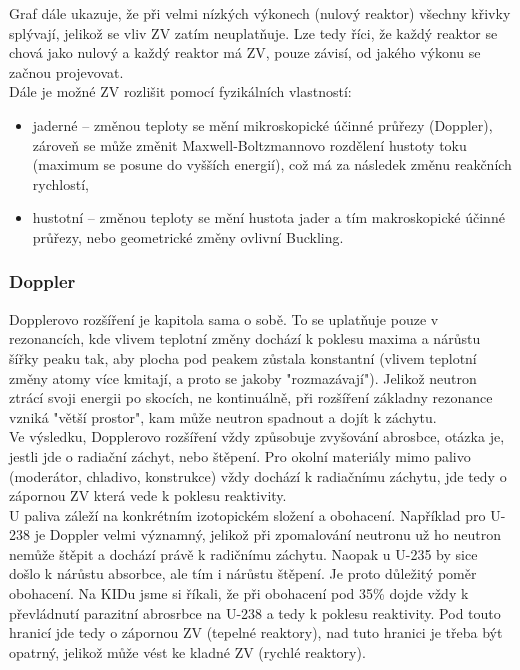 Graf dále ukazuje, že při velmi nízkých výkonech (nulový reaktor) všechny křivky splývají, jelikož se vliv ZV zatím neuplatňuje. Lze tedy říci, že každý reaktor se chová jako nulový a každý reaktor má ZV, pouze závisí, od jakého výkonu se začnou projevovat.\\

Dále je možné ZV rozlišit pomocí fyzikálních vlastností:

\begin{itemize}
  \item jaderné -- změnou teploty se mění mikroskopické účinné průřezy (Doppler), zároveň se může změnit Maxwell-Boltzmannovo rozdělení hustoty toku (maximum se posune do vyšších energií), což má za následek změnu reakčních rychlostí,
  \item hustotní -- změnou teploty se mění hustota jader a tím makroskopické účinné průřezy, nebo geometrické změny ovlivní Buckling.
\end{itemize}

\subsubsection{Doppler}

Dopplerovo rozšíření je kapitola sama o sobě. To se uplatňuje pouze v rezonancích, kde vlivem teplotní změny dochází k poklesu maxima a nárůstu šířky peaku tak, aby plocha pod peakem zůstala konstantní (vlivem teplotní změny atomy více kmitají, a proto se jakoby "rozmazávají"). Jelikož neutron ztrácí svoji energii po skocích, ne kontinuálně, při rozšíření základny rezonance vzniká "větší prostor", kam může neutron spadnout a dojít k záchytu.\\

Ve výsledku, Dopplerovo rozšíření vždy způsobuje zvyšování abrosbce, otázka je, jestli jde o radiační záchyt, nebo štěpení. Pro okolní materiály mimo palivo (moderátor, chladivo, konstrukce) vždy dochází k radiačnímu záchytu, jde tedy o zápornou ZV která vede k poklesu reaktivity.\\

U paliva záleží na konkrétním izotopickém složení a obohacení. Například pro U-238 je Doppler velmi významný, jelikož při zpomalování neutronu už ho neutron nemůže štěpit a dochází právě k radičnímu záchytu. Naopak u U-235 by sice došlo k nárůstu absorbce, ale tím i nárůstu štěpení. Je proto důležitý poměr obohacení. Na KIDu jsme si říkali, že při obohacení pod 35\% dojde vždy k převládnutí parazitní abrosrbce na U-238 a tedy k poklesu reaktivity. Pod touto hranicí jde tedy o zápornou ZV (tepelné reaktory), nad tuto hranici je třeba být opatrný, jelikož může vést ke kladné ZV (rychlé reaktory).

